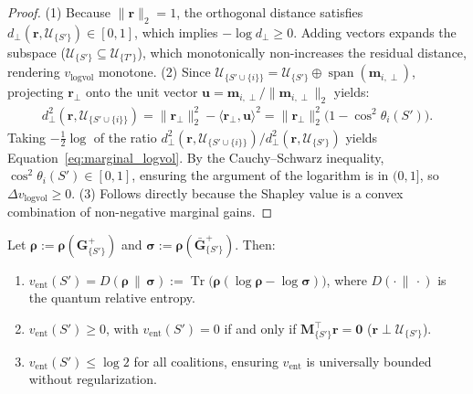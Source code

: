 \begin{proof}
(1) Because $\|\mathbf{r}\|_2 = 1$, the orthogonal distance satisfies $d_{\perp}(\mathbf{r}, \mathcal{U}_{\{S'\}}) \in [0, 1]$, which implies $-\log d_{\perp} \ge 0$. Adding vectors expands the subspace ($\mathcal{U}_{\{S'\}} \subseteq \mathcal{U}_{\{T'\}}$), which monotonically non-increases the residual distance, rendering $v_{\text{logvol}}$ monotone. 
(2) Since $\mathcal{U}_{\{S' \cup \{i\}\}} = \mathcal{U}_{\{S'\}} \oplus \operatorname{span}(\mathbf{m}_{i, \perp})$, projecting $\mathbf{r}_{\perp}$ onto the unit vector $\mathbf{u} = \mathbf{m}_{i, \perp} / \|\mathbf{m}_{i, \perp}\|_2$ yields:
\begin{align*}
    d_{\perp}^2(\mathbf{r}, \mathcal{U}_{\{S' \cup \{i\}\}}) = \|\mathbf{r}_{\perp}\|_2^2 - \langle \mathbf{r}_{\perp}, \mathbf{u} \rangle^2 = \|\mathbf{r}_{\perp}\|_2^2 \big(1 - \cos^2 \theta_i(S')\big).
\end{align*}
Taking $-\frac{1}{2}\log$ of the ratio $d_{\perp}^2(\mathbf{r}, \mathcal{U}_{\{S' \cup \{i\}\}}) / d_{\perp}^2(\mathbf{r}, \mathcal{U}_{\{S'\}})$ yields Equation~\eqref{eq:marginal_logvol}. By the Cauchy--Schwarz inequality, $\cos^2 \theta_i(S') \in [0, 1]$, ensuring the argument of the logarithm is in $(0, 1]$, so $\Delta v_{\text{logvol}} \ge 0$. 
(3) Follows directly because the Shapley value is a convex combination of non-negative marginal gains.
\end{proof}


\begin{proposition}\label{prop:v_ent}
Let $\boldsymbol{\rho} := \boldsymbol{\rho}(\mathbf{G}^{+}_{\{S'\}})$ and $\boldsymbol{\sigma} := \boldsymbol{\rho}(\bar{\mathbf{G}}^{+}_{\{S'\}})$. Then:
\begin{enumerate}
    \item $v_{\text{ent}}(S') = D(\boldsymbol{\rho} \,\|\, \boldsymbol{\sigma}) := \operatorname{Tr}\big(\boldsymbol{\rho}(\log \boldsymbol{\rho} - \log \boldsymbol{\sigma})\big)$, where $D(\cdot \,\|\, \cdot)$ is the quantum relative entropy.
    \item $v_{\text{ent}}(S') \ge 0$, with $v_{\text{ent}}(S') = 0$ if and only if $\mathbf{M}_{\{S'\}}^\top \mathbf{r} = \mathbf{0}$ ($\mathbf{r} \perp \mathcal{U}_{\{S'\}}$).
    \item $v_{\text{ent}}(S') \le \log 2$ for all coalitions, ensuring $v_{\text{ent}}$ is universally bounded without regularization.
\end{enumerate}
\end{proposition}


